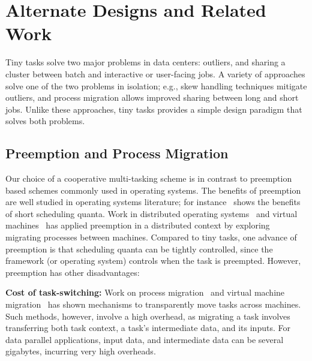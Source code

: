 \section{Alternate Designs and Related Work}
\label{sec:alternate}

Tiny tasks solve two major problems in data centers: outliers, and sharing
a cluster between batch and interactive or user-facing jobs. A variety of
approaches solve one of the two problems in isolation; e.g., skew handling
techniques mitigate outliers, and process migration allows improved
sharing between long and short jobs.  Unlike these approaches, tiny tasks
provides a simple design paradigm that solves both problems.

\subsection{Preemption and Process Migration}

Our choice of a cooperative multi-tasking scheme is in contrast to
preemption based schemes commonly used in operating systems. 
The benefits of
preemption are well studied in operating
systems literature; for instance~\cite{sherman1972trace} shows the benefits
of short scheduling quanta. Work in distributed
operating systems~\cite{douglis1991transparent,milojivcic2000process,rozier1991overview} and virtual machines~\cite{tanenbaum1990experiences}
has applied preemption in a distributed context by exploring migrating
processes between machines.
Compared to tiny tasks, one advance of preemption is that scheduling quanta
can be tightly controlled, since the framework (or operating system) controls
when the task is preempted. However, preemption has other disadvantages:

\vspace{4pt}\noindent\textbf{Cost of task-switching:}
Work on process
migration~\cite{douglis1991transparent,milojivcic2000process} and virtual
machine migration~\cite{clark2005live} has shown mechanisms to transparently
move tasks across machines. Such methods, however, involve a high overhead, as
migrating a task involves transferring both task context, a task's intermediate
data, and its inputs. For data parallel applications, input data, and intermediate
data can be several gigabytes, incurring very high overheads.

